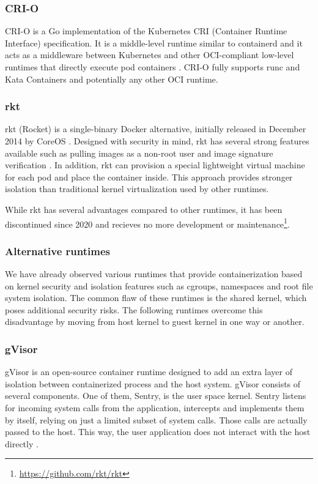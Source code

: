 \subsubsection*{CRI-O}

CRI-O is a Go implementation of the Kubernetes CRI (Container Runtime Interface) specification. It is a middle-level runtime similar to containerd and it acts as a middleware between Kubernetes and other OCI-compliant low-level runtimes that directly execute pod containers \cite{c:4}. CRI-O fully supports runc and Kata Containers and potentially any other OCI runtime.

\subsubsection*{rkt}

rkt (Rocket) is a single-binary Docker alternative, initially released in December 2014 by CoreOS \cite{c:9}. Designed with security in mind, rkt has several strong features available such as pulling images as a non-root user and image signature verification \cite{c:10}. In addition, rkt can provision a special lightweight virtual machine for each pod and place the container inside. This approach provides stronger isolation than traditional kernel virtualization used by other runtimes.

While rkt has several advantages compared to other runtimes, it has been discontinued since 2020 and recieves no more development or maintenance\footnote{\url{https://github.com/rkt/rkt}}.


\clearpage
\subsubsection{Alternative runtimes}

We have already observed various runtimes that provide containerization based on kernel security and isolation features such as cgroups, namespaces and root file system isolation. The common flaw of these runtimes is the shared kernel, which poses additional security risks. The following runtimes overcome this disadvantage by moving from host kernel to guest kernel in one way or another.

\subsubsection*{gVisor}

gVisor is an open-source container runtime designed to add an extra layer of isolation between containerized process and the host system. gVisor consists of several components. One of them, Sentry, is the user space kernel. Sentry listens for incoming system calls from the application, intercepts and implements them by itself, relying on just a limited subset of system calls. Those calls are actually passed to the host. This way, the user application does not interact with the host directly \cite{acm:3}.

